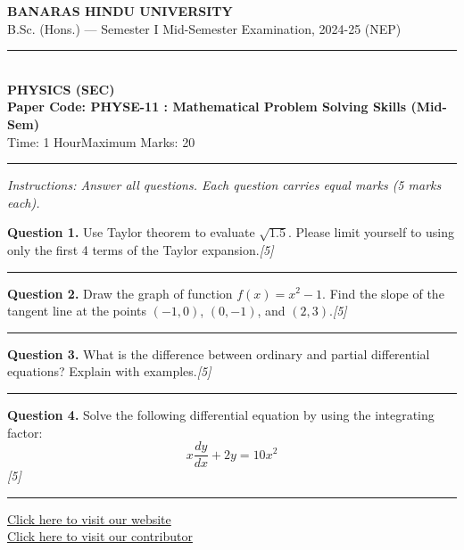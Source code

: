 \documentclass[11pt,a4paper]{article}
\newcommand{\pts}[1]{\hfill   \textit{[#1]}}
\begin{document}
\begin{center}
  {\large\bfseries BANARAS HINDU UNIVERSITY}\\[2pt]
  {\normalsize B.Sc. (Hons.) --- Semester I Mid-Semester Examination, 2024-25 (NEP)}\\[6pt]
  \rule{0.8\linewidth}{0.5pt}\\[6pt]
  {\large\bfseries PHYSICS (SEC)}\\[4pt]
  {\large\bfseries Paper Code: PHYSE-11 : Mathematical Problem Solving Skills (Mid-Sem)}\\[4pt]
  {\normalsize Time: 1 Hour\hfill Maximum Marks: 20}
\end{center}

\rule{\linewidth}{0.4pt}

\smallskip



\noindent   \textit{Instructions: Answer all questions. Each question carries equal marks (5 marks each).}

\bigskip




\noindent   \textbf{Question 1.} Use Taylor theorem to evaluate $\sqrt{1.5}$. Please limit yourself to using only the first 4 terms of the Taylor expansion.\pts{5}

\medskip\rule{\linewidth}{0.2pt}\medskip




\noindent   \textbf{Question 2.} Draw the graph of function $f(x) = x^2 - 1$. Find the slope of the tangent line at the points $(-1,0)$, $(0,-1)$, and $(2,3)$.\pts{5}

\medskip\rule{\linewidth}{0.2pt}\medskip




\noindent   \textbf{Question 3.} What is the difference between ordinary and partial differential equations? Explain with examples.\pts{5}

\medskip\rule{\linewidth}{0.2pt}\medskip




\noindent   \textbf{Question 4.} Solve the following differential equation by using the integrating factor:
\[
  x \frac{dy}{dx} + 2y = 10x^2
\]\pts{5}

\vfill
\rule{\linewidth}{0.4pt}

\begin{center}\small
\href{https://bhu-exam.vercel.app/}{Click here to visit our website}\\[4pt]
\href{https://me-aryan.vercel.app/}{Click here to visit our contributor}
\end{center}
\end{document}

